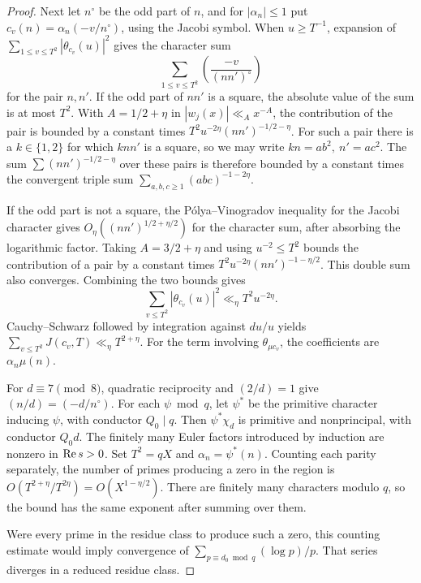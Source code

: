 \begin{proof}
Next let \(n^\circ\) be the odd part of \(n\), and for \(|\alpha_n|\le1\) put
\(c_v(n)=\alpha_n(-v/n^\circ)\), using the Jacobi symbol.
When \(u\ge T^{-1}\), expansion of \(\sum_{1\le v\le T^2}|\theta_{c_v}(u)|^2\)
gives the character sum
\[
  \sum_{1\le v\le T^2}\left(\frac{-v}{(nn')^\circ}\right)
\]
for the pair \(n,n'\). If the odd part of \(nn'\) is a square, the absolute
value of the sum is at most \(T^2\). With \(A=1/2+\eta\) in
\(|w_j(x)|\ll_A x^{-A}\), the contribution of the pair is bounded by a constant
times \(T^2u^{-2\eta}(nn')^{-1/2-\eta}\).
For such a pair there is a \(k\in\{1,2\}\) for which \(knn'\) is a square, so
we may write \(kn=ab^2,\ n'=ac^2\). The sum \(\sum(nn')^{-1/2-\eta}\) over these
pairs is therefore bounded by a constant times the convergent triple sum
\(\sum_{a,b,c\ge1}(abc)^{-1-2\eta}\).

If the odd part is not a square, the Pólya--Vinogradov inequality for the Jacobi
character gives \(O_\eta((nn')^{1/2+\eta/2})\) for the character sum, after
absorbing the logarithmic factor. Taking \(A=3/2+\eta\) and using \(u^{-2}\le T^2\)
bounds the contribution of a pair by a constant times
\(T^2u^{-2\eta}(nn')^{-1-\eta/2}\). This double sum also converges. Combining the
two bounds gives
\[
 \sum_{v\le T^2}|\theta_{c_v}(u)|^2\ll_\eta T^2u^{-2\eta}.
\]
Cauchy--Schwarz followed by integration against \(du/u\) yields
\(\sum_{v\le T^2}J(c_v,T)\ll_\eta T^{2+\eta}\).
For the term involving \(\theta_{\mu c_v}\), the coefficients are
\(\alpha_n\mu(n)\).

For \(d\equiv7\pmod8\), quadratic reciprocity and \((2/d)=1\) give
\((n/d)=(-d/n^\circ)\). For each \(\psi\bmod q\), let \(\psi^\ast\) be the
primitive character inducing \(\psi\), with conductor \(Q_0\mid q\).
Then \(\psi^\ast\chi_d\) is primitive and nonprincipal, with conductor \(Q_0d\).
The finitely many Euler factors introduced by induction are nonzero in
\(\operatorname{Re} s>0\). Set \(T^2=qX\) and \(\alpha_n=\psi^\ast(n)\).
Counting each parity separately, the number of primes producing a zero
in the region is \(O(T^{2+\eta}/T^{2\eta})=O(X^{1-\eta/2})\).
There are finitely many characters modulo \(q\), so the bound has the same
exponent after summing over them.

Were every prime in the residue class to produce such a zero, this counting
estimate would imply convergence of \(\sum_{p\equiv d_0\bmod q}(\log p)/p\).
That series diverges in a reduced residue class.
\end{proof}

